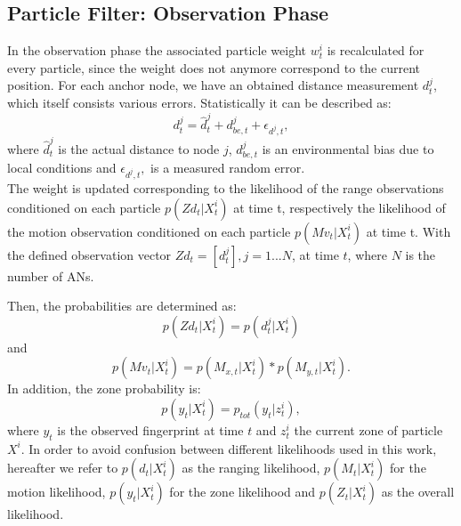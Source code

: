 \subsection{Particle Filter: Observation Phase}
In the observation phase the associated particle weight $w^{i}_{t}$ is recalculated for every particle, since the weight does not anymore correspond to the current position. For each anchor node, we have an obtained distance measurement $d^{j}_{t}$, which itself consists various errors. Statistically it can be described as: 
\begin{equation}
d^{j}_{t} = \hat{d}^{j}_{t} + d^{j}_{be, t} + \epsilon_{d^{j}, t},
\label{eqn:distances}
\end{equation}
where $\hat{d}^{j}_{t}$ is the actual distance to node $j$, $d^{j}_{be, t}$ is an environmental bias due to local conditions and $\epsilon_{d^{j}, t},$ is a measured random error.\\
\noindent\hspace*{5mm}%
The weight is updated corresponding to the likelihood of the range observations conditioned on each particle $p(Zd_{t} | X^{i}_{t})$ at time t, respectively the likelihood of the motion observation conditioned on each particle $p(Mv_{t} | X^{i}_{t})$ at time t. With the defined observation vector $Zd_{t} = [d_{t}^{j}], j = 1...N$, at time $t$, where $N$ is the number of
ANs.


 Then, the probabilities are determined as:
\begin{equation}
p(Zd_{t} | X^{i}_{t}) = p(d_{t}^{j} | X^{i}_{t})
\label{eqn:probability_distance}
\end{equation}
and
\begin{equation}
p(Mv_{t} | X^{i}_{t}) = p(M_{x,t} | X^{i}_{t}) * p(M_{y,t} | X^{i}_{t}).
\label{eqn:probability_movement}
\end{equation}
In addition, the zone probability is:
\begin{equation}
p(y_t | X^{i}_{t}) = p_{tot}(y_{t} | z^{i}_{t}),
\label{eqn:probability_zone}
\end{equation}
where $y_t$ is the observed fingerprint at time $t$ and $z^{i}_{t}$ the current zone of particle $X^{i}$.
In order to avoid confusion between different likelihoods used in this work, hereafter we refer to $p(d_{t} | X^{i}_{t})$ as the ranging likelihood, $p(M_{t} | X^{i}_{t})$ for the motion likelihood, $p(y_t | X^{i}_{t})$ for the zone likelihood and $p(Z_{t} | X^{i}_{t})$ as the overall likelihood.


